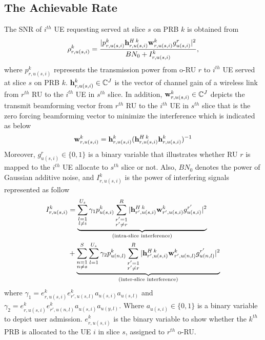 \documentclass[conference]{IEEEtran}
\begin{document}
\subsection{The Achievable Rate}
The SNR of $i^{th}$ UE requesting served at slice $s$ on PRB $k$ is obtained from
\begin{equation}\label{eq2}
\rho_{r,u(s,i)}^{k} =  \frac{|p_{r,u(s,i)}^{k}{\bold{h}_{r,u(s,i)}^{H \: k}} \bold{w}_{r,u(s,i)}^{k} g_{u(s,i)}^r|^2}{BN_0 + I_{r,u(s,i)}^{k}},
\end{equation} 
where $p_{r,u(s,i)}^{k}$ represents the transmission power from o-RU $r$ to $i^{th}$ UE served at slice $s$ on PRB $k$. 
${\bold{h}_{r,u(s,i)}^{k}} \in \mathbb{C}^{J}$ is the vector of channel gain of a wireless link from 
$r^{th}$ RU to the $i^{th}$ UE in $s^{th}$ slice. In addition, $\bold{w}_{r,u(s,i)}^{k} \in \mathbb{C}^{J}$ depicts the  transmit beamforming vector from $r^{th}$ RU to the $i^{th}$ UE in $s^{th}$ slice that is the zero forcing beamforming vector to minimize the interference which is indicated as below
\begin{equation}
\bold{w}_{r,u(s,i)}^{k} = {\bold{h}_{r,u(s,i)}^{k}}({\bold{h}_{r,u(s,i)}^{H \: k}} {\bold{h}_{r,u(s,i)}^{k}})^{-1}
\end{equation}
Moreover, $g_{u(s,i)}^r \in \{0,1\}$ is a binary variable that illustrates whether RU $r$ is mapped to the $i^{th}$ UE allocate to $s^{th}$ slice or not. 
Also, $BN_0$ denotes the power of Gaussian additive noise, and $I_{r,u(s,i)}^{k}$ is the power of interfering signals represented as follow
\begin{equation}
\begin{split}
I_{r,u(s,i)}^{k} &=
 \underbrace{\sum_{\substack{l=1 \\ l\neq i}}^{{U}_{s}} \gamma_{1}  p_{u(s,i)}^{k}\sum_{\substack{r'=1 \\ r'\neq r}}^{R}|{\bold{h}_{r',u(s,i)}^{H \: k}} \bold{w}_{r',u(s,i)}^{k} g_{u(s,i)}^{r'}|^2}_{\text{(intra-slice interference)}}\\
&+ \underbrace{\sum_{\substack{n = 1 \\ n\neq s}}^{S}\sum_{l=1}^{{U}_s} \gamma_{2}  p_{u(n,l)}^{k}\sum_{\substack{r'=1 \\ r'\neq r}}^{R}|{\bold{h}_{r',u(s,i)}^{H \: k}} \bold{w}_{r',u(n,l)}^{k} g_{u(n,l)}^{r'}|^2}_{\text{(inter-slice interference)}}\\
\end{split}
\end{equation}
where $\gamma_{1} = e^{k}_{r,u(s,i)}e^{k}_{r',u(s,l)}a_{u(s,i)}a_{u(s,l)}$
and $\gamma_{2} = e^{k}_{r,u(s,i)}e^{k}_{r',u(n,l)}a_{u(s,i)}a_{u(y,l)}$.
Where $a_{u(s,i)} \in \{0,1\}$ is a binary variable to depict user admission.
$e^{k}_{r,u(s,i)}$ is the binary variable to show whether the $k^{th}$ PRB is allocated to the UE $i$ in slice $s$, assigned to $r^{th}$ o-RU.
\end{document}
